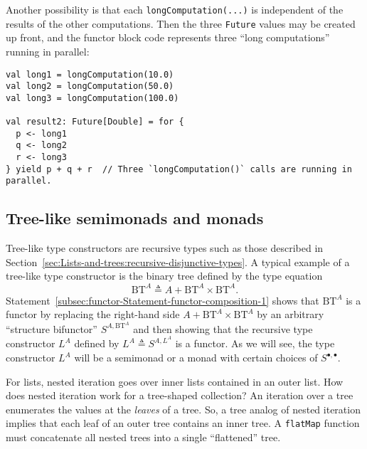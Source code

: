 Another possibility is that each \lstinline!longComputation(...)!
is independent of the results of the other computations. Then the
three \lstinline!Future! values may be created up front, and the
functor block code represents three \textsf{``}long computations\textsf{''} running
in parallel:
\begin{lstlisting}
val long1 = longComputation(10.0)
val long2 = longComputation(50.0)
val long3 = longComputation(100.0)

val result2: Future[Double] = for {
  p <- long1
  q <- long2
  r <- long3
} yield p + q + r  // Three `longComputation()` calls are running in parallel.
\end{lstlisting}


\subsection{Tree-like semimonads and monads\label{subsec:Tree-like-semimonads-and-monads}}

Tree-like type constructors are recursive types such as those described
in Section~\ref{sec:Lists-and-trees:recursive-disjunctive-types}.
A typical example of a tree-like type constructor is the binary tree
defined by the type equation
\[
\text{BT}^{A}\triangleq A+\text{BT}^{A}\times\text{BT}^{A}.
\]
Statement~\ref{subsec:functor-Statement-functor-composition-1} shows
that $\text{BT}^{A}$ is a functor by replacing the right-hand side
$A+\text{BT}^{A}\times\text{BT}^{A}$ by an arbitrary \textsf{``}structure
bifunctor\textsf{''} $S^{A,\text{BT}^{A}}$ and then showing that the recursive
type constructor $L^{A}$ defined by $L^{A}\triangleq S^{A,L^{A}}$
is a functor. As we will see, the type constructor $L^{A}$ will be
a semimonad or a monad with certain choices of $S^{\bullet,\bullet}$.

For lists, nested iteration goes over inner lists contained in an
outer list. How does nested iteration work for a tree-shaped collection?
An iteration over a tree enumerates the values at the \emph{leaves}
of a tree. So, a tree analog of nested iteration implies that each
leaf of an outer tree contains an inner tree. A \lstinline!flatMap!
function must concatenate all nested trees into a single \textsf{``}flattened\textsf{''}
tree. 

